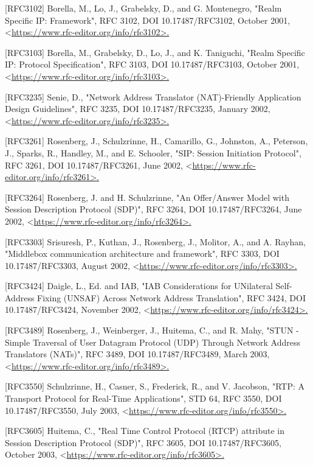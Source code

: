 \documentclass{article}
\begin{document}
[RFC3102]  Borella, M., Lo, J., Grabelsky, D., and G. Montenegro, "Realm Specific IP: Framework", RFC 3102, DOI 10.17487/RFC3102, October 2001, <\url{https://www.rfc-editor.org/info/rfc3102>.}

[RFC3103]  Borella, M., Grabelsky, D., Lo, J., and K. Taniguchi, "Realm Specific IP: Protocol Specification", RFC 3103, DOI 10.17487/RFC3103, October 2001, <\url{https://www.rfc-editor.org/info/rfc3103>.}

[RFC3235]  Senie, D., "Network Address Translator (NAT)-Friendly Application Design Guidelines", RFC 3235, DOI 10.17487/RFC3235, January 2002, <\url{https://www.rfc-editor.org/info/rfc3235>.}

[RFC3261]  Rosenberg, J., Schulzrinne, H., Camarillo, G., Johnston, A., Peterson, J., Sparks, R., Handley, M., and E. Schooler, "SIP: Session Initiation Protocol", RFC 3261, DOI 10.17487/RFC3261, June 2002, <\url{https://www.rfc-editor.org/info/rfc3261>.}

[RFC3264]  Rosenberg, J. and H. Schulzrinne, "An Offer/Answer Model with Session Description Protocol (SDP)", RFC 3264, DOI 10.17487/RFC3264, June 2002, <\url{https://www.rfc-editor.org/info/rfc3264>.}

[RFC3303]  Srisuresh, P., Kuthan, J., Rosenberg, J., Molitor, A., and A. Rayhan, "Middlebox communication architecture and framework", RFC 3303, DOI 10.17487/RFC3303, August 2002, <\url{https://www.rfc-editor.org/info/rfc3303>.}

[RFC3424]  Daigle, L., Ed. and IAB, "IAB Considerations for UNilateral Self-Address Fixing (UNSAF) Across Network Address Translation", RFC 3424, DOI 10.17487/RFC3424, November 2002, <\url{https://www.rfc-editor.org/info/rfc3424>.}

[RFC3489]  Rosenberg, J., Weinberger, J., Huitema, C., and R. Mahy, "STUN - Simple Traversal of User Datagram Protocol (UDP) Through Network Address Translators (NATs)", RFC 3489, DOI 10.17487/RFC3489, March 2003, <\url{https://www.rfc-editor.org/info/rfc3489>.}

[RFC3550]  Schulzrinne, H., Casner, S., Frederick, R., and V. Jacobson, "RTP: A Transport Protocol for Real-Time Applications", STD 64, RFC 3550, DOI 10.17487/RFC3550, July 2003, <\url{https://www.rfc-editor.org/info/rfc3550>.}

[RFC3605]  Huitema, C., "Real Time Control Protocol (RTCP) attribute in Session Description Protocol (SDP)", RFC 3605, DOI 10.17487/RFC3605, October 2003, <\url{https://www.rfc-editor.org/info/rfc3605>.}
\end{document}
